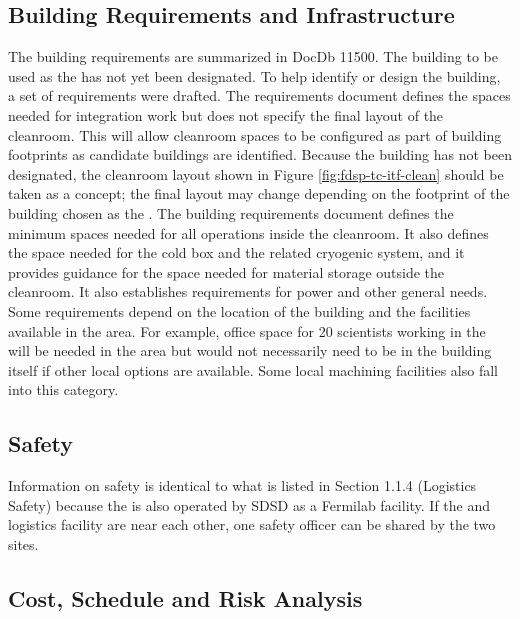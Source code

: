 \subsection{Building Requirements and Infrastructure}
\label{sec:fdsp-tc-itf-req}
The  building requirements are summarized in DocDb 11500.\cite{bib:docdb11500} The building to be used as the  has not yet been designated. To help identify or design the  building, a set of requirements were drafted. The requirements document defines the spaces needed for integration work but does not specify the final layout of the cleanroom. This will allow cleanroom spaces to be configured as part of building footprints as candidate buildings are identified. Because the building has not been designated, the cleanroom layout shown in Figure \ref{fig:fdsp-tc-itf-clean} should be taken as a concept; the final layout may change depending on the footprint of the building chosen as the . The building requirements document\cite{docdb-11500}  defines the minimum spaces needed for all operations inside the  cleanroom. It also defines the space needed for the cold box and the related cryogenic system, and it provides guidance for the space needed for material storage outside the cleanroom. It also establishes requirements for power and other general needs. Some requirements depend on the location of the building and the facilities available in the area. For example, office space for 20 scientists working in the  will be needed in the area but would not necessarily need to be in the  building itself if other local options are available. Some local machining facilities also fall into this category. 

\subsection{Safety}
\label{sec:fdsp-tc-itf-safety}

Information on  safety is identical to what is listed in Section 1.1.4 (Logistics Safety) because the  is also operated by SDSD as a Fermilab facility.    If the  and logistics facility are near each other, one safety officer can be shared by the two sites.    

\subsection{Cost, Schedule and Risk Analysis}
\label{sec:fdsp-tc-itf-cost}

